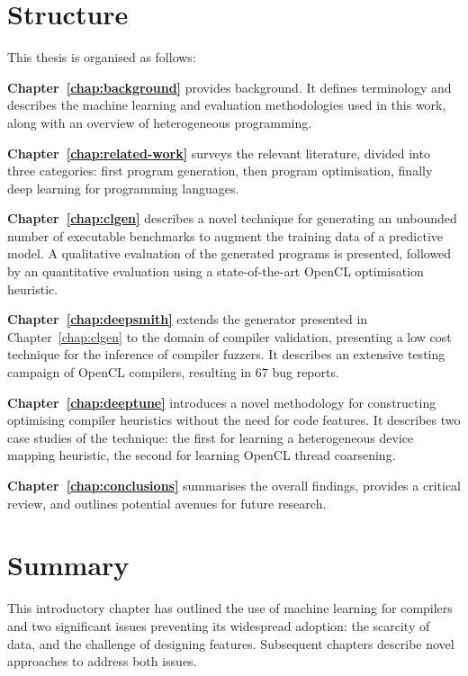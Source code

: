 \section{Structure}

This thesis is organised as follows:

\textbf{Chapter~\ref{chap:background}} provides background. It defines terminology and describes the machine learning and evaluation methodologies used in this work, along with an overview of heterogeneous programming.

\textbf{Chapter~\ref{chap:related-work}} surveys the relevant literature, divided into three categories: first program generation, then program optimisation, finally deep learning for programming languages.

\textbf{Chapter~\ref{chap:clgen}} describes a novel technique for generating an unbounded number of executable benchmarks to augment the training data of a predictive model. A qualitative evaluation of the generated programs is presented, followed by an quantitative evaluation using a state-of-the-art OpenCL optimisation heuristic.

\textbf{Chapter~\ref{chap:deepsmith}} extends the generator presented in Chapter~\ref{chap:clgen} to the domain of compiler validation, presenting a low cost technique for the inference of compiler fuzzers. It describes an extensive testing campaign of OpenCL compilers, resulting in 67 bug reports.

\textbf{Chapter~\ref{chap:deeptune}} introduces a novel methodology for constructing optimising compiler heuristics without the need for code features. It describes two case studies of the technique: the first for learning a heterogeneous device mapping heuristic, the second for learning OpenCL thread coarsening.

\textbf{Chapter~\ref{chap:conclusions}} summarises the overall findings, provides a critical review, and outlines potential avenues for future research.


\section{Summary}

This introductory chapter has outlined the use of machine learning for compilers and two significant issues preventing its widespread adoption: the scarcity of data, and the challenge of designing features. Subsequent chapters describe novel approaches to address both issues.
